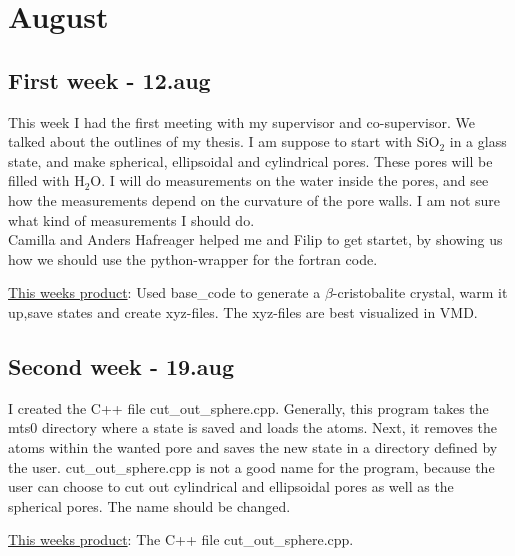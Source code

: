 \chapter{August}

\section{First week - 12.aug}
This week I had the first meeting with my supervisor and co-supervisor. We talked about the outlines of my thesis. I am suppose to start with $\text{SiO}_2$ in a glass state, and make spherical, ellipsoidal and cylindrical pores. These pores will be filled with $\text{H}_2\text{O}$. I will do measurements on the water inside the pores, and see how the measurements depend on the curvature of the pore walls. I am not sure what kind of measurements I should do.\\
Camilla and Anders Hafreager helped me and Filip to get startet, by showing us how we should use the python-wrapper for the fortran code. \\
\begin{framed}
\underline{This weeks product}: Used base\_code to generate a $\beta$-cristobalite crystal, warm it up,save states and create xyz-files. The xyz-files are best visualized in VMD.  
\end{framed}
\section{Second week - 19.aug}
I created the C++ file cut\_out\_sphere.cpp. Generally, this program takes the mts0 directory where a state is saved and loads the atoms. Next, it removes the atoms within the wanted pore and saves the new state in a directory defined by the user. cut\_out\_sphere.cpp is not a good name for the program, because the user can choose to cut out cylindrical and ellipsoidal pores as well as the spherical pores. The name should be changed.
\begin{framed}
\underline{This weeks product}: The C++ file cut\_out\_sphere.cpp.
\end{framed}
